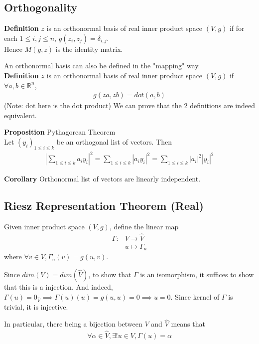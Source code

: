 \documentclass{article}
\begin{document}
\subsection{Orthogonality}
\textbf{Definition} $z$ is an orthonormal basis of real inner product space $(V,g)$ if for each $1\leq i,j\leq n$, $g(z_i,z_j)=\delta_{i,j}$.\\
Hence $M(g,z)$ is the identity matrix.

An orthonormal basis can also be defined in the "mapping" way.\\
\textbf{Definition} $z$ is an orthonormal basis of real inner product space $(V,g)$ if $\forall a,b\in \mathbb{R}^n$,
\begin{align*}
	g(za, zb) = dot(a,b)
\end{align*}
(Note: dot here is the dot product)
We can prove that the 2 definitions are indeed equivalent.

\textbf{Proposition} Pythagorean Theorem\\
Let $(y_i)_{1\leq i\leq k}$ be an orthogonal list of vectors. Then 
\begin{align*}
	\left\lvert \sum_{1\leq i\leq k}a_iy_i\right\rvert^2 = \sum_{1\leq i\leq k}|a_iy_i|^2 = \sum_{1\leq i\leq k}|a_i|^2|y_i|^2
\end{align*}

\textbf{Corollary} Orthonormal list of vectors are linearly independent.

\subsection{Riesz Representation Theorem (Real)}
Given inner product space $(V,g)$, define the linear map
\begin{align*}
	\Gamma: &V\rightarrow \hat{V}\\
	&u\mapsto \Gamma_u
\end{align*}
where $\forall v\in V, \Gamma_u(v) = g(u,v)$.

Since $dim(V)=dim(\hat{V})$, to show that $\Gamma$ is an isomorphism, it suffices to show that this is a injection. And indeed, $\Gamma(u)=0_{\hat{V}}\implies \Gamma(u)(u)=g(u,u)=0\implies u=0$. Since kernel of $\Gamma$ is trivial, it is injective.

In particular, there being a bijection between $V$ and $\hat{V}$ means that 
\begin{align*}
\forall \alpha \in \hat{V}, \exists! u\in V, \Gamma(u) = \alpha
\end{align*}
\end{document}
